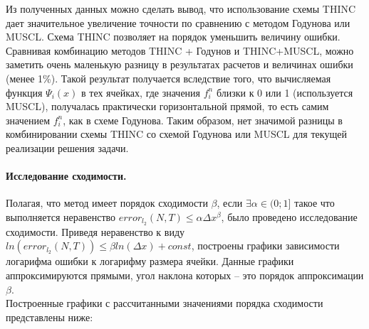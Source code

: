 \documentclass[12pt,a4paper]{article}
\begin{document}
Из полученных данных можно сделать вывод, что использование схемы THINC дает значительное увеличение точности по сравнению с методом Годунова или MUSCL. Схема THINC позволяет на порядок уменьшить величину ошибки. Сравнивая комбинацию методов THINC + Годунов и THINC+MUSCL, можно заметить очень маленькую разницу в результатах расчетов и величинах ошибки (менее 1\%). Такой результат получается вследствие того, что вычисляемая функция $\Psi_i(x)$ в тех ячейках, где значения $f_i^n$ близки к 0 или 1 (используется MUSCL), получалась практически горизонтальной прямой, то есть самим значением $f_i^n$, как в схеме Годунова. Таким образом, нет значимой разницы в комбинировании схемы THINC со схемой Годунова или MUSCL для текущей реализации решения задачи.

\paragraph{Исследование сходимости.}
Полагая, что метод имеет порядок сходимости $\beta$, если $\exists \alpha \in (0; 1]$ такое что выполняется неравенство $error_{l_2}(N, T)\leq\alpha\Delta x^{\beta}$, было проведено исследование сходимости. Приведя неравенство к виду $ln(error_{l_2}(N, T))\leq\beta ln(\Delta x)+const$, построены графики зависимости логарифма ошибки к логарифму размера ячейки. Данные графики аппроксимируются прямыми, угол наклона которых – это порядок аппроксимации $\beta$.\\
Построенные графики с рассчитанными значениями порядка сходимости представлены ниже:
\\
\medskip
\\
\end{document}
